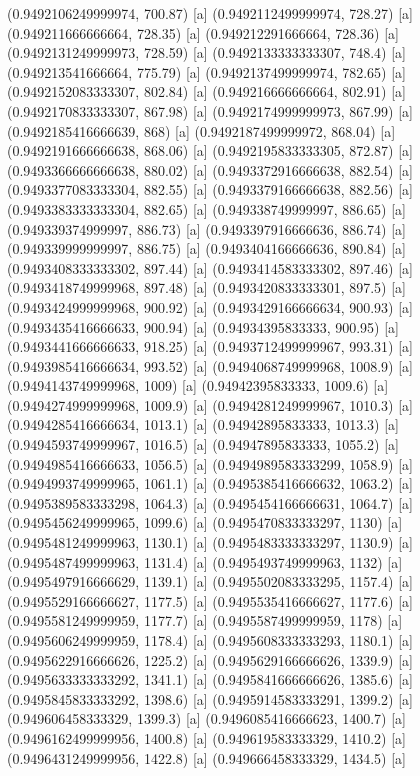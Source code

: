 {{{(0.9492106249999974, 700.87) [a] 
(0.9492112499999974, 728.27) [a] 
(0.949211666666664, 728.35) [a] 
(0.949212291666664, 728.36) [a] 
(0.9492131249999973, 728.59) [a] 
(0.9492133333333307, 748.4) [a] 
(0.949213541666664, 775.79) [a] 
(0.9492137499999974, 782.65) [a] 
(0.9492152083333307, 802.84) [a] 
(0.949216666666664, 802.91) [a] 
(0.9492170833333307, 867.98) [a] 
(0.9492174999999973, 867.99) [a] 
(0.9492185416666639, 868) [a] 
(0.9492187499999972, 868.04) [a] 
(0.9492191666666638, 868.06) [a] 
(0.9492195833333305, 872.87) [a] 
(0.9493366666666638, 880.02) [a] 
(0.9493372916666638, 882.54) [a] 
(0.9493377083333304, 882.55) [a] 
(0.9493379166666638, 882.56) [a] 
(0.9493383333333304, 882.65) [a] 
(0.949338749999997, 886.65) [a] 
(0.949339374999997, 886.73) [a] 
(0.9493397916666636, 886.74) [a] 
(0.949339999999997, 886.75) [a] 
(0.9493404166666636, 890.84) [a] 
(0.9493408333333302, 897.44) [a] 
(0.9493414583333302, 897.46) [a] 
(0.9493418749999968, 897.48) [a] 
(0.9493420833333301, 897.5) [a] 
(0.9493424999999968, 900.92) [a] 
(0.9493429166666634, 900.93) [a] 
(0.9493435416666633, 900.94) [a] 
(0.94934395833333, 900.95) [a] 
(0.9493441666666633, 918.25) [a] 
(0.9493712499999967, 993.31) [a] 
(0.9493985416666634, 993.52) [a] 
(0.9494068749999968, 1008.9) [a] 
(0.9494143749999968, 1009) [a] 
(0.94942395833333, 1009.6) [a] 
(0.9494274999999968, 1009.9) [a] 
(0.9494281249999967, 1010.3) [a] 
(0.9494285416666634, 1013.1) [a] 
(0.94942895833333, 1013.3) [a] 
(0.9494593749999967, 1016.5) [a] 
(0.94947895833333, 1055.2) [a] 
(0.9494985416666633, 1056.5) [a] 
(0.9494989583333299, 1058.9) [a] 
(0.9494993749999965, 1061.1) [a] 
(0.9495385416666632, 1063.2) [a] 
(0.9495389583333298, 1064.3) [a] 
(0.9495454166666631, 1064.7) [a] 
(0.9495456249999965, 1099.6) [a] 
(0.9495470833333297, 1130) [a] 
(0.9495481249999963, 1130.1) [a] 
(0.9495483333333297, 1130.9) [a] 
(0.9495487499999963, 1131.4) [a] 
(0.9495493749999963, 1132) [a] 
(0.9495497916666629, 1139.1) [a] 
(0.9495502083333295, 1157.4) [a] 
(0.9495529166666627, 1177.5) [a] 
(0.9495535416666627, 1177.6) [a] 
(0.9495581249999959, 1177.7) [a] 
(0.9495587499999959, 1178) [a] 
(0.9495606249999959, 1178.4) [a] 
(0.9495608333333293, 1180.1) [a] 
(0.9495622916666626, 1225.2) [a] 
(0.9495629166666626, 1339.9) [a] 
(0.9495633333333292, 1341.1) [a] 
(0.9495841666666626, 1385.6) [a] 
(0.9495845833333292, 1398.6) [a] 
(0.9495914583333291, 1399.2) [a] 
(0.949606458333329, 1399.3) [a] 
(0.9496085416666623, 1400.7) [a] 
(0.9496162499999956, 1400.8) [a] 
(0.949619583333329, 1410.2) [a] 
(0.9496431249999956, 1422.8) [a] 
(0.949666458333329, 1434.5) [a] 
}}}
